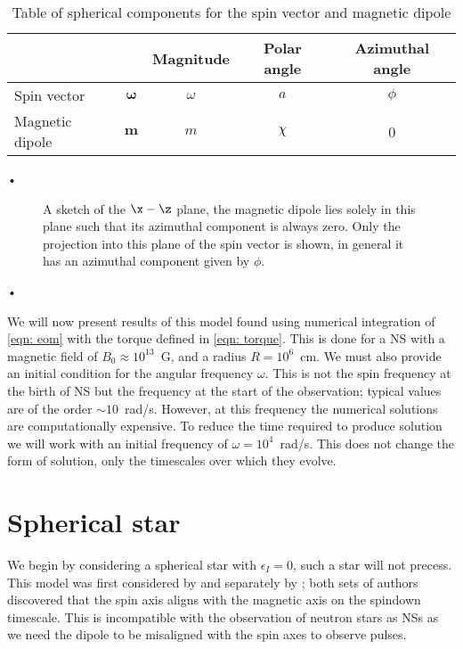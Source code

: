 \documentclass[/home/greg/Thesis/main/main.tex]{subfiles}
\def\thisdir{/home/greg/Neutron_star_modelling/TimingNoiseModels/InTheRotatingFrame}
\begin{document}
\begin{table}[ht]
\centering
\begin{tabular}{|l|c|c|c|c|} \hline
 \multicolumn{2}{|c|}{} & Magnitude & Polar angle & Azimuthal angle \\ \hline
Spin vector  & $\boldsymbol{\omega}$ & $\omega$ & $a$ & $\phi$ \\ \hline
Magnetic dipole &  $\boldsymbol{m}$ & $m$ & $\chi$ & 0 \\ \hline
\end{tabular}•
\caption{Table of spherical components for the spin vector and magnetic dipole}
\label{tab: definitions}
\end{table}

\begin{figure}[ht]
\centering

\caption{A sketch of the  $\x-\z$ plane,  the magnetic dipole lies solely in
this plane such that its azimuthal component is always zero.  Only the
projection into this plane of the spin vector is shown, in general it has an
azimuthal component given by $\phi$.}
	\label{fig: sketch01}
\end{figure}•

We will now present results of this model found using numerical integration of
\eqref{eqn: eom} with the torque defined in \eqref{eqn: torque}. This is done
for a NS with a magnetic field of $B_{0}\approx10^{13}$~G, and a radius
$R=10^{6}$~cm. We must also provide an initial condition for the angular
frequency $\omega$. This is not the spin frequency at the birth of NS but the
frequency at the start of the observation; typical values are of the order
$\sim 10$~rad/s. However, at this frequency the numerical solutions are
computationally expensive. To reduce the time required to produce solution we
will work with an initial frequency of $\omega = 10^{4}$~rad/s. This does not
change the form of solution, only the timescales over which they evolve. 

\FloatBarrier
\section{Spherical star}
\label{sec: spherical}

We begin by considering a spherical star with $\epsilon_{I}=0$, such a star will
not precess.
This model was first considered by \citet{Davis1970}
and separately by \citet{Michel1970}; both sets of authors discovered that the
spin axis aligns with the magnetic axis on the spindown timescale. This is
incompatible with the observation of neutron stars as NSs as we need the
dipole to be misaligned with the spin axes to observe pulses. 
\end{document}

